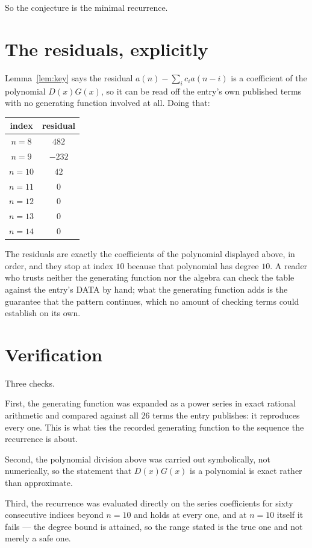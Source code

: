 \documentclass[11pt,a4paper]{article}
\theoremstyle{plain}
\theoremstyle{definition}
\begin{document}
So the conjecture is the minimal recurrence.

\section{The residuals, explicitly}

Lemma~\ref{lem:key} says the residual $a(n)-\sum_ic_ia(n-i)$ is a coefficient of the
polynomial $D(x)G(x)$, so it can be read off the entry's own published terms with no
generating function involved at all. Doing that:
\begin{center}
\begin{tabular}{cc}
index & residual \\ \hline
$n=8$ & $482$ \\
$n=9$ & $-232$ \\
$n=10$ & $42$ \\
$n=11$ & $0$ \\
$n=12$ & $0$ \\
$n=13$ & $0$ \\
$n=14$ & $0$
\end{tabular}
\end{center}
The residuals are exactly the coefficients of the polynomial displayed above, in order, and
they stop at index $10$ because that polynomial has degree $10$. A reader who trusts
neither the generating function nor the algebra can check the table against the entry's DATA
by hand; what the generating function adds is the guarantee that the pattern continues, which
no amount of checking terms could establish on its own.

\section{Verification}

Three checks.

First, the generating function was expanded as a power series in exact rational arithmetic and
compared against all $26$ terms the entry publishes: it reproduces every one. This is
what ties the recorded generating function to the sequence the recurrence is about.

Second, the polynomial division above was carried out symbolically, not numerically, so the
statement that $D(x)G(x)$ is a polynomial is exact rather than approximate.

Third, the recurrence was evaluated directly on the series coefficients for sixty consecutive
indices beyond $n=10$ and holds at every one, and at $n=10$ itself it fails --- the
degree bound is attained, so the range stated is the true one and not merely a safe one.
\end{document}
